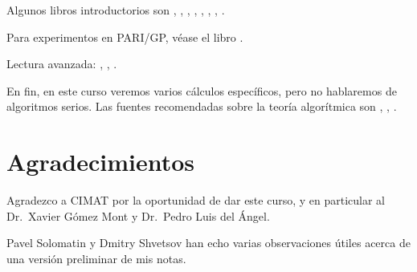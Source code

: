 Algunos libros introductorios son
\cite[Chapters 12, 13, 17]{Ireland-Rosen}, 
\cite{Alaca-Williams},
\cite{Kato-NT-2},
\cite{Frohlich-Taylor},
\cite{Marcus-NF},
\cite{Samuel-TAN},
\cite[Chapters 4, 5]{Borevich-Shafarevich},
\cite{Cox-2013}.

Para experimentos en PARI/GP, véase el libro
\cite{Rodriguez-Villegas-2007}.

Lectura avanzada:
\cite{Neukirch-ANT},
\cite{Lang-ANT},
\cite{Cassels-Frohlich}.

En fin, en este curso veremos varios cálculos específicos, pero no hablaremos
de algoritmos serios. Las fuentes recomendadas sobre la teoría algorítmica
son
\cite{Pohst-Zassenhaus},
\cite{Lenstra-1992},
\cite{Cohen-GTM138}.

\section{Agradecimientos}

Agradezco a CIMAT por la oportunidad de dar este curso, y en particular
al Dr.~Xavier Gómez Mont y Dr.~Pedro Luis del Ángel.

Pavel Solomatin y Dmitry Shvetsov han echo varias observaciones útiles acerca de
una versión preliminar de mis notas.

